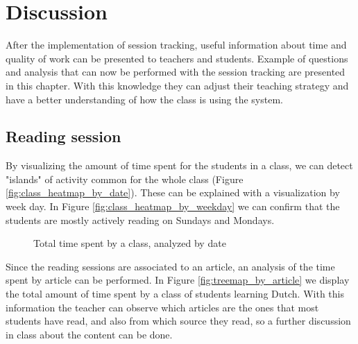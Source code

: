 \chapter{Discussion}
After the implementation of session tracking, useful information about time and quality of work can be presented to teachers and students. Example of questions and analysis that can now be performed with the session tracking are presented in this chapter.
With this knowledge they can adjust their teaching strategy and have a better understanding of how the class is using the system.

\section{Reading session}

By visualizing the amount of time spent for the students in a class, we can detect "islands" of activity common for the whole class (Figure \ref{fig:class_heatmap_by_date}). These can be explained with a visualization by week day. In Figure \ref{fig:class_heatmap_by_weekday} we can confirm that the students are mostly actively reading on Sundays and Mondays.

\begin{figure}[bth]
	\myfloatalign
	 \quad 
	 \quad
	\caption{Total time spent by a class, analyzed by date}
\end{figure}


Since the reading sessions are associated to an article, an analysis of the time spent by article can be performed. In Figure \ref{fig:treemap_by_article} we display the total amount of time spent by a class of students learning Dutch. With this information the teacher can observe which articles are the ones that most students have read, and also from which source they read, so a further discussion in class about the content can be done.

